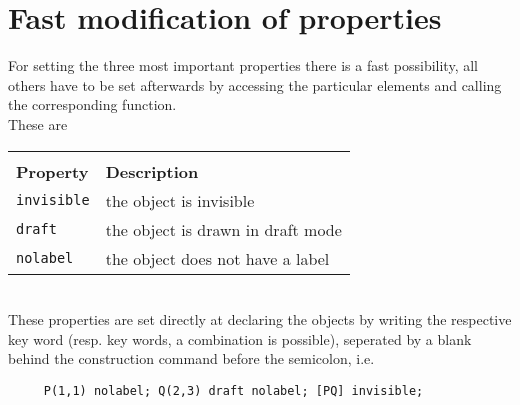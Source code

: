 \documentclass[10pt]{article}
\begin{document}
\section{Fast modification of properties}
For setting the three most important properties there is a fast
possibility, all others have to be set afterwards by accessing the
particular elements and calling the corresponding function.
\\ These are \\
\begin{tabular}{|l|l|} \hline \\[-0.75em] {\large
\textbf{Property}} & {\large \textbf{Description}} \\
\hline\hline\verb+invisible+ & the object is invisible \\
\hline\verb+draft+ & the object is drawn in draft mode \\
\hline\verb+nolabel+ & the object does not have a label
\\ \hline
\end{tabular} \vspace*{0.5cm} \\
These properties are set directly at declaring the objects by
writing the respective key word (resp. key words, a combination is
possible), seperated by a blank behind the construction command
before the semicolon, i.e.
\begin{verbatim}
     P(1,1) nolabel; Q(2,3) draft nolabel; [PQ] invisible;
\end{verbatim}
\end{document}
